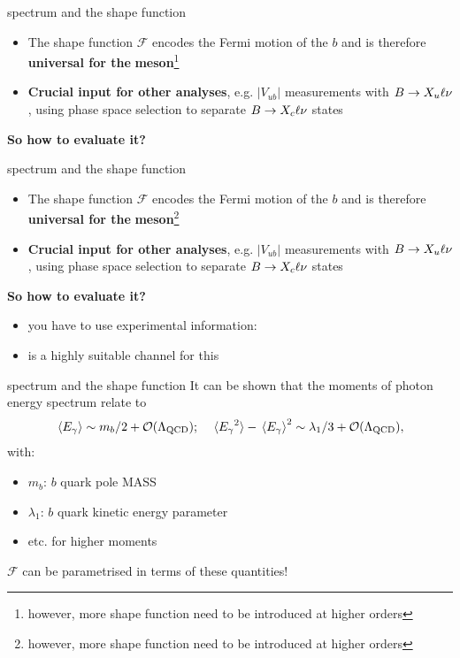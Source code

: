 \documentclass[xcolor=dvipsnames]{beamer}
\begin{document}
   \begin{frame}{\BtoXsgamma spectrum and the shape function}
      \scriptsize
      \begin{itemize}
         \item The shape function $\mathcal{F}$ encodes the Fermi motion of the $b$ and is therefore \textbf{universal for the}  \textbf{meson}\footnote[1]{\tiny however, more shape function need to be introduced at higher orders}
         \item \textbf{Crucial input for other analyses}, e.g. $|V_{ub}|$ measurements with $B\rightarrow X_u\ell\nu$, using phase space selection to separate $B\rightarrow X_c\ell\nu$ states
      \end{itemize}

      \textbf{So how to evaluate it?}

   \end{frame}


   \begin{frame}{\BtoXsgamma spectrum and the shape function}
      \scriptsize
      \begin{itemize}
         \item The shape function $\mathcal{F}$ encodes the Fermi motion of the $b$ and is therefore \textbf{universal for the}  \textbf{meson}\footnote[1]{\tiny however, more shape function need to be introduced at higher orders}
         \item \textbf{Crucial input for other analyses}, e.g. $|V_{ub}|$ measurements with $B\rightarrow X_u\ell\nu$, using phase space selection to separate $B\rightarrow X_c\ell\nu$ states
      \end{itemize}

      \textbf{So how to evaluate it?}
      \begin{itemize}
         \item[\ra] you have to use experimental information: 
         \item[\ra] \BtoXsgamma is a highly suitable channel for this
      \end{itemize}

   \end{frame}

   \begin{frame}{\BtoXsgamma spectrum and the shape function}
      \scriptsize
      It can be shown that the moments of photon energy spectrum relate to
      \begin{equation}\nonumber
         \expval**{{E_{\gamma}}} \sim m_b/2+{\cal O}(\Lambda_{\mathrm{QCD}}); \quad \expval**{{E_{\gamma}}^2}-\expval**{{E_{\gamma}}}^2 \sim \lambda_1/3+{\cal O}(\Lambda_{\mathrm{QCD}}),
     \end{equation}
     with:
     \begin{itemize}
      \item [] $m_b$: $b$ quark pole MASS
      \item [] $\lambda_1$: $b$ quark kinetic energy parameter
      \item [] etc. for higher moments
     \end{itemize}
   $\mathcal{F}$ can be parametrised in terms of these quantities!
   \end{frame}
\end{document}
